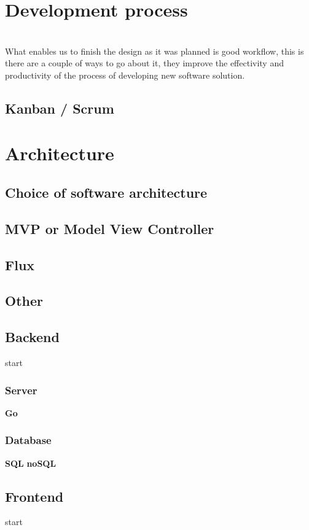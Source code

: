 \section{Development process}
\\
What enables us to finish the design as it was planned is good workflow, this is there are a couple of ways to go about it, they improve the effectivity and productivity of the process of developing new software solution.
\subsection{Kanban / Scrum}

\section{Architecture}

\subsection{Choice of software architecture}

\subsection{MVP or Model View Controller}

\subsection{Flux}

\subsection{Other}

\subsection{Backend}
start
\subsubsection{Server}
\textbf{Go}
\subsubsection{Database}
\textbf{SQL}
\textbf{noSQL}
\subsection{Frontend}
start
